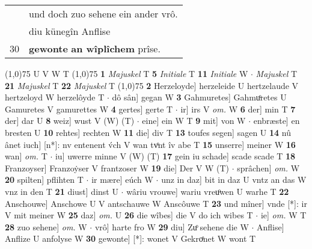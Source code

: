 \documentclass[8pt,a4paper,notitlepage]{article}
\begin{document}
\begin{table}[ht]
\begin{minipage}[t]{0.5\linewidth}
\begin{tabular}{rl}
 & und doch zuo sehene ein ander vrô.\\ 
 & diu künegîn Anflise\\ 
30 & \textbf{gewonte} \textbf{an wîplîchem} prîse.\\ 
\end{tabular}
\scriptsize
\line(1,0){75} \newline
U V W T \newline
\line(1,0){75} \newline
\textbf{1} \textit{Majuskel} T  \textbf{5} \textit{Initiale} T  \textbf{11} \textit{Initiale} W   $\cdot$ \textit{Majuskel} T  \textbf{21} \textit{Majuskel} T  \textbf{22} \textit{Majuskel} T  \newline
\line(1,0){75} \newline
\textbf{2} Herzeloyde] herzeleide U hertzelaude V hertzeloyd W herzelôyde T  $\cdot$ dô sân] gegan W \textbf{3} Gahmuretes] Gahmuͦretes U Gamuretes V gamurettes W \textbf{4} gertes] gerte T  $\cdot$ ir] irs V \textit{om.} W \textbf{6} der] min T \textbf{7} der] dar U \textbf{8} weiz] wust V (W) (T)  $\cdot$ eine] ein W T \textbf{9} mit] von W  $\cdot$ enbræste] en bresten U \textbf{10} rehtes] rechten W \textbf{11} die] div T \textbf{13} toufes segen] sagen U \textbf{14} nû ânet iuch] [n*]: nv entenent v́ch V wan tvͦnt îv abe T \textbf{15} unserre] meiner W \textbf{16} wan] \textit{om.} T  $\cdot$ iu] uwerre minne V (W) (T) \textbf{17} gein iu schade] scade scade T \textbf{18} Franzoyser] Franzoẏser V frantzoser W \textbf{19} die] Der V W (T)  $\cdot$ sprâchen] \textit{om.} W \textbf{20} spilten] pflihten T  $\cdot$ ir mære] eúch W  $\cdot$ unz in daz] bit in daz U vntz an das W vnz in den T \textbf{21} diust] dinst U  $\cdot$ wâriu vrouwe] wariu vreuͦwen U warhe T \textbf{22} Anschouwe] Anschowe U V antschauwe W Anscôuwe T \textbf{23} und mîner] vnde [*]: ir V mit meiner W \textbf{25} daz] \textit{om.} U \textbf{26} die wîbes] die V do ich wibes T  $\cdot$ ie] \textit{om.} W T \textbf{28} zuo sehene] \textit{om.} W  $\cdot$ vrô] harte fro W \textbf{29} diu] Zuͦ sehene die W  $\cdot$ Anflise] Anflize U anfolyse W \textbf{30} gewonte] [*]: wonet V Gekroͤnet W wont T \newline
\end{minipage}
\end{table}
\end{document}
